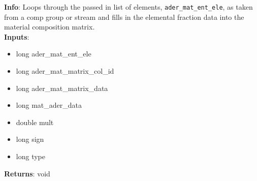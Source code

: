 \textbf{Info}: Loops through the passed in list of elements,
\texttt{ader\_mat\_ent\_ele}, as taken from a comp group or stream and fills
in the elemental fraction data into the material composition matrix.\\

\noindent \textbf{Inputs}:
\begin{itemize}
\item{long ader\_mat\_ent\_ele}
\item{long ader\_mat\_matrix\_col\_id}
\item{long ader\_mat\_matrix\_data}
\item{long mat\_ader\_data}
\item{double mult}
\item{long sign}
\item{long type}
\end{itemize}

\noindent \textbf{Returns}: void
